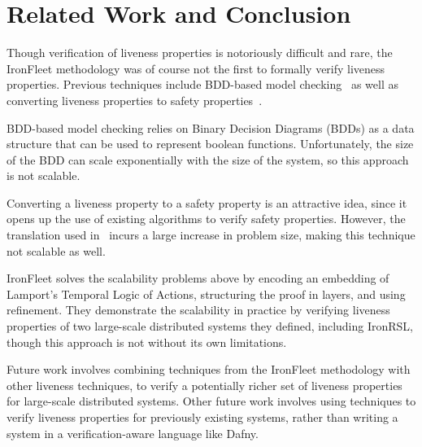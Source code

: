 \documentclass{llncs}
\begin{document}
\section{Related Work and Conclusion}\label{sec:rel-work}
Though verification of liveness properties is notoriously difficult and rare,
the IronFleet methodology was of course not the first to formally verify
liveness properties. Previous techniques include BDD-based model
checking~\cite{Ravi2000} as well as converting liveness properties to safety
properties~\cite{Schuppan2006}.

BDD-based model checking relies on Binary Decision Diagrams (BDDs) as a data
structure that can be used to represent boolean functions. Unfortunately, the
size of the BDD can scale exponentially with the size of the system, so this
approach is not scalable.

Converting a liveness property to a safety property is an attractive idea, since
it opens up the use of existing algorithms to verify safety properties. However,
the translation used in~\cite{Schuppan2006} incurs a large increase in problem
size, making this technique not scalable as well.

IronFleet solves the scalability problems above by encoding an embedding of
Lamport's Temporal Logic of Actions, structuring the proof in layers, and using 
refinement. They demonstrate the scalability in
practice by verifying liveness properties of two large-scale distributed systems
they defined, including IronRSL, though this approach is not without its own
limitations.

Future work involves combining techniques from the IronFleet methodology with
other liveness techniques, to verify a potentially richer set of liveness
properties for large-scale distributed systems. Other future work involves using
techniques to verify liveness properties for previously existing systems, rather
than writing a system in a verification-aware language like Dafny.

%
%



\end{document}
